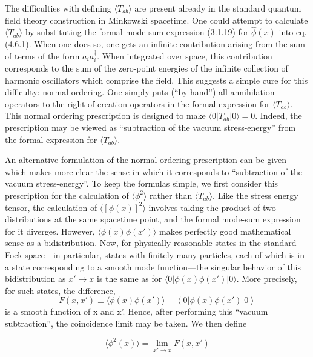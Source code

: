 \documentclass[11pt,a4paper]{article}
\providecommand{\ket}[1]{\left\lvert#1\right\rangle}
\providecommand{\bra}[1]{\left\langle#1\right\rvert}
\begin{document}
The difficulties with defining \(\langle T_{ab}\rangle \) are present already in the standard quantum field theory construction in Minkowski spacetime. One could attempt to calculate \(\langle T_{ab}\rangle \) by substituting the formal mode sum expression (\hyperref[eq:3.1.19]{3.1.19}) for \(\hat{\phi}(x)\) into eq. (\hyperref[eq:4.6.1]{4.6.1}). When one does so, one gets an infinite contribution arising from the sum of terms of the form \(a_ia_i^{\dagger}\). When integrated over space, this contribution corresponds to the sum of the zero-point energies of the infinite collection of harmonic oscillators which comprise the field. This suggests a simple cure for this difficulty: normal ordering. One simply puts (``by hand'') all annihilation operators to the right of creation operators in the formal expression for \(\langle T_{ab}\rangle \). This normal ordering prescription is designed to make \(\langle 0 \lvert T_{ab}\rvert 0\rangle = 0\). Indeed, the prescription may be viewed as ``subtraction of the vacuum stress-energy'' from the formal expression for \(\langle T_{ab}\rangle \).

An alternative formulation of the normal ordering prescription can be given which makes more clear the sense in which it corresponds to ``subtraction of the vacuum stress-energy''. To keep the formulas simple, we first consider this prescription for the calculation of \(\langle \phi^2\rangle \) rather than \(\langle T_{ab}\rangle \). Like the stress energy tensor, the calculation of \(\langle [\phi(x)]^2\rangle \) involves taking the product of two distributions at the same spacetime point, and the formal mode-sum expression for it diverges. However, \(\langle \phi(x)\phi(x')\rangle \) makes perfectly good mathematical sense as a bidistribution. Now, for physically reasonable states in the standard Fock space---in particular, states with finitely many particles, each of which is in a state corresponding to a smooth mode function---the singular behavior of this bidistribution as \(x'\to x\) is the same as for \(\langle 0\lvert \phi(x)\phi(x')\rvert 0\rangle \). More precisely, for such states, the difference,
\begin{equation*}
F(x,x') \equiv \langle \phi(x)\phi(x') \rangle - \bra{0} \phi(x)\phi(x')\ket{0} \tag{4.6.3}\label{eq:4.6.3}
\end{equation*}
is a smooth function of x and x'. Hence, after performing this ``vacuum subtraction'', the coincidence limit may be taken. We then define

\hypertarget{source-101}{}
\begin{equation*}
\langle \phi^{2}(x)\rangle = \lim_{x'\to x} F(x,x') \tag{4.6.4}\label{eq:4.6.4}
\end{equation*}
\end{document}
